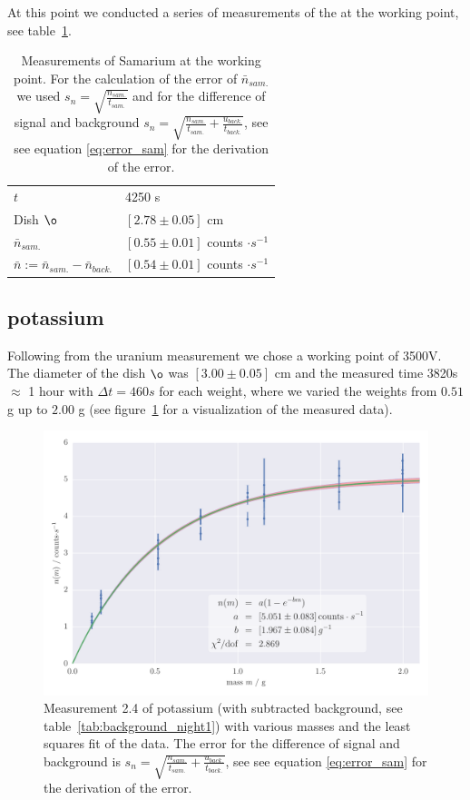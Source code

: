 At this point we conducted a series of measurements of the at the working point, see table~\ref{tab:mes1}.
\begin{table}
    \caption{Measurements of Samarium at the working point. For the calculation
    of the error of $\bar{n}_{sam.}$ we used $s_n = \sqrt{\frac{n_{sam.}}{t_{sam.}}}$ and for the difference
    of signal and background $s_n = \sqrt{\frac{n_{sam.}}{t_{sam.}}+\frac{u_{back.}}{t_{back.}} }$, see see equation \eqref{eq:error_sam} for
    the derivation of the error.}
    \begin{tabular}{l l}
        \rowcolor{tabcolor}$t$ & 4250 s \\ 
        Dish $\o$ & $\left [ 2.78 \pm 0.05 \right ]$ cm \\ 
        \rowcolor{tabcolor}$\bar{n}_{sam.}$ & $\left [ 0.55 \pm 0.01 \right ] $ counts $\cdot s^{-1}$ \\ 
        $\bar{n} := \bar{n}_{sam.} - \bar{n}_{back.}$ & $\left [ 0.54 \pm 0.01 \right ] $ counts $\cdot s^{-1}$ \\ 
    \end{tabular}
    \label{tab:mes1}
\end{table}
\subsection{potassium}
\label{subsec:potassium}
Following from the uranium measurement we chose a working point of 3500V. The diameter 
of the dish $\o$ was $\left [ 3.00 \pm 0.05 \right ]$ cm and the measured time 3820s $\approx$ 1 hour with
$\Delta t = 460s$ for each weight, where we varied the weights from $0.51$ g up to $2.00$ g (see figure~\ref{fig:2_4_potassium} 
for a visualization of the measured data).
\begin{figure}[H]
    \centering
    \includegraphics[width=\linewidth]{analysis/figures/measurement_2_4}
    \caption{Measurement 2.4 of potassium (with subtracted background, see table~\ref{tab:background_night1}) with various masses
    and the least squares fit of the data. The error for the difference
    of signal and background is $s_n = \sqrt{\frac{n_{sam.}}{t_{sam.}}+\frac{u_{back.}}{t_{back.}} }$, see see equation \eqref{eq:error_sam} for
    the derivation of the error.}
    \label{fig:2_4_potassium}
\end{figure}
